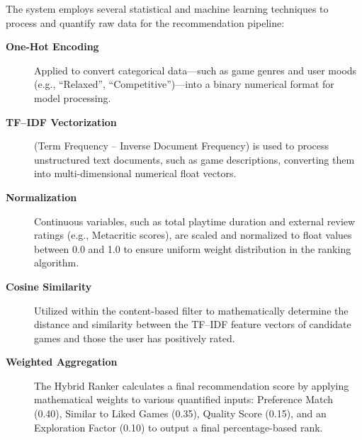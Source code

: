 The system employs several statistical and machine learning techniques to process and quantify raw data for the recommendation pipeline:

\begin{description}

\item[\textbf{One-Hot Encoding}]
Applied to convert categorical data—such as game genres and user moods (e.g., ``Relaxed'', ``Competitive'')—into a binary numerical format for model processing.

\item[\textbf{TF--IDF Vectorization}]
(Term Frequency – Inverse Document Frequency) is used to process unstructured text documents, such as game descriptions, converting them into multi-dimensional numerical float vectors.

\item[\textbf{Normalization}]
Continuous variables, such as total playtime duration and external review ratings (e.g., Metacritic scores), are scaled and normalized to float values between 0.0 and 1.0 to ensure uniform weight distribution in the ranking algorithm.

\item[\textbf{Cosine Similarity}]
Utilized within the content-based filter to mathematically determine the distance and similarity between the TF--IDF feature vectors of candidate games and those the user has positively rated.

\item[\textbf{Weighted Aggregation}]
The Hybrid Ranker calculates a final recommendation score by applying mathematical weights to various quantified inputs: Preference Match (0.40), Similar to Liked Games (0.35), Quality Score (0.15), and an Exploration Factor (0.10) to output a final percentage-based rank.

\end{description}

